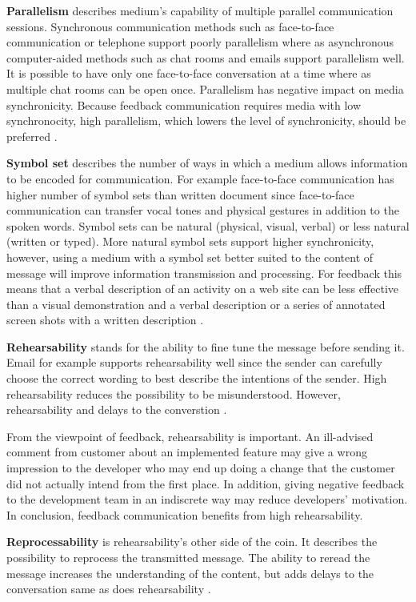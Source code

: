 \documentclass[english,12pt,a4paper,pdftex]{article}
\begin{document}
\textbf{Parallelism} describes medium's capability of multiple parallel communication sessions. Synchronous communication methods such as face-to-face communication or telephone support poorly parallelism where as asynchronous computer-aided methods such as chat rooms and emails support parallelism well. It is possible to have only one face-to-face conversation at a time where as multiple chat rooms can be open once. Parallelism has negative impact on media synchronicity. Because feedback communication requires media with low synchronocity, high parallelism, which lowers the level of synchronicity, should be preferred \citep{dennis1999}.

\textbf{Symbol set} describes the number of ways in which a medium allows information to be encoded for communication. For example face-to-face communication has higher number of symbol sets than written document since face-to-face communication can transfer vocal tones and physical gestures in addition to the spoken words. Symbol sets can be natural (physical, visual, verbal) or less natural (written or typed). More natural symbol sets support higher synchronicity, however, using a medium with a symbol set better suited to the content of message will improve information transmission and processing. For feedback this means that a verbal description of an activity on a web site can be less effective than a visual demonstration and a verbal description or a series of annotated screen shots with a written description \citep{dennis1999}.

\textbf{Rehearsability} stands for the ability to fine tune the message before sending it. Email for example supports rehearsability well since the sender can carefully choose the correct wording to best describe the intentions of the sender. High rehearsability reduces the possibility to be misunderstood. However, rehearsability and delays to the converstion \citep{dennis1999}.

From the viewpoint of feedback, rehearsability is important. An ill-advised comment from customer about an implemented feature may give a wrong impression to the developer who may end up doing a change that the customer did not actually intend from the first place. In addition, giving negative feedback to the development team in an indiscrete way may reduce developers' motivation. In conclusion, feedback communication benefits from high rehearsability.

\textbf{Reprocessability} is rehearsability's other side of the coin. It describes the possibility to reprocess the transmitted message. The ability to reread the message increases the understanding of the content, but adds delays to the conversation same as does rehearsability \citep{dennis1999}.
\end{document}
